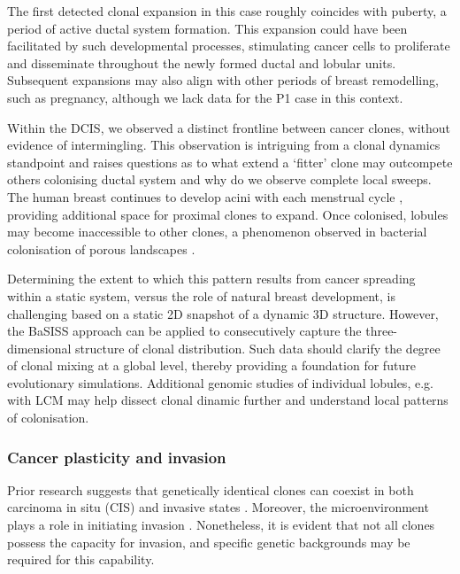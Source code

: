 The first detected clonal expansion in this case roughly coincides with puberty, a period of active ductal system formation. This expansion could have been facilitated by such developmental processes, stimulating cancer cells to proliferate and disseminate throughout the newly formed ductal and lobular units. Subsequent expansions may also align with other periods of breast remodelling, such as pregnancy, although we lack data for the P1 case in this context.

Within the \ac{DCIS}, we observed a distinct frontline between cancer clones, without evidence of intermingling. This observation is intriguing from a clonal dynamics standpoint and raises questions as to what extend a `fitter' clone may outcompete others colonising ductal system and why do we observe complete local sweeps. The human breast continues to develop acini with each menstrual cycle \parencite{Javed2013-ew}, providing additional space for proximal clones to expand. Once colonised, lobules may become inaccessible to other clones, a phenomenon observed in bacterial colonisation of porous landscapes \parencite{Conwill2022-sp}.

Determining the extent to which this pattern results from cancer spreading within a static system, versus the role of natural breast development, is challenging based on a static 2D snapshot of a dynamic 3D structure. However, the \ac{BaSISS} approach can be applied to consecutively capture the three-dimensional structure of clonal distribution. Such data should clarify the degree of clonal mixing at a global level, thereby providing a foundation for future evolutionary simulations. Additional genomic studies of individual lobules, e.g. with \ac{LCM} may help dissect clonal dinamic further and understand local patterns of colonisation. 

\subsubsection*{Cancer plasticity and invasion}

Prior research suggests that genetically identical clones can coexist in both carcinoma in situ (\ac{CIS}) and invasive states \parencite{Casasent2018-gx}. Moreover, the microenvironment plays a role in initiating invasion \parencite{Sinha2021-mf,Risom2022-uw} . Nonetheless, it is evident that not all clones possess the capacity for invasion, and specific genetic backgrounds may be required for this capability.

